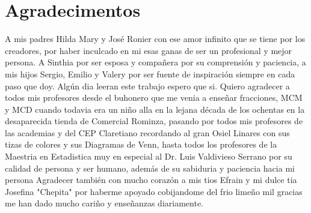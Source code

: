 \chapter*{Agradecimentos}
	\lipsum[2] \lipsum[3] \lipsum[4] \lipsum[7]
	A mis padres Hilda Mary y José Ronier con ese amor infinito que se tiene por los creadores, por haber inculcado en mi esas ganas de ser un profesional y mejor persona. A Sinthia por ser esposa y compañera por su comprensión y paciencia, a mis hijos Sergio, Emilio y Valery por ser fuente de inspiración siempre en cada paso que doy. Algún dia leeran este trabajo espero que si. 
Quiero agradecer a todos mis profesores desde el buhonero que me venia a enseñar fracciones, MCM y MCD cuando todavia era un niño alla en la lejana década de los ochentas en la desaparecida tienda de Comercial Rominza, pasando por todos mis profesores de las academias y del CEP Claretiano recordando al gran Osiel Linares con sus tizas de colores y sus Diagramas de Venn, hasta todos los profesores de la Maestria en Estadistica muy en especial al Dr. Luis Valdivieso Serrano por su calidad de persona y ser humano, además de su sabiduria y paciencia hacia mi persona
Agradecer también con mucho corazón a mis tios Efrain y mi dulce tia Josefina "Chepita" por haberme apoyado cobijandome del frio limeño mil gracias me han dado mucho cariño y enseñanzas diariamente.
    